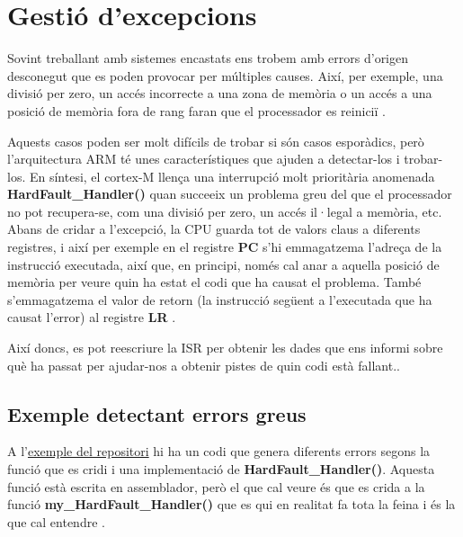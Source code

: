 
\chapter{Gestió d'excepcions}
\label{ch:exceptions}
Sovint treballant amb sistemes encastats ens trobem amb errors d'origen desconegut que es poden provocar per múltiples causes. Així, per exemple, una divisió per zero, un accés incorrecte a una zona de memòria o un accés a una posició de memòria fora de rang faran que el processador es reiniciï \cite[102]{DesignersGuide}\cite[318]{ARMsdg}\cite{KielHardFault}.

Aquests casos poden ser molt difícils de trobar si són casos esporàdics, però l'arquitectura ARM té unes característiques que ajuden a detectar-los i trobar-los. En síntesi, el cortex-M llença una interrupció molt prioritària anomenada {\bf HardFault\_Handler()} quan succeeix un problema greu del que el processador no pot recupera-se, com una divisió per zero, un accés il·legal a memòria, etc. Abans de cridar a l'excepció, la CPU guarda tot de valors claus a diferents registres, i així per exemple en el registre {\bf PC} s'hi emmagatzema l'adreça de la instrucció executada, així que, en principi, només cal anar a aquella posició de memòria per veure quin ha estat el codi que ha causat el problema. També s'emmagatzema el valor de retorn (la  instrucció següent a l'executada que ha causat l'error) al registre {\bf LR} \cite{BlogHardFalut}.

Així doncs, es pot reescriure la ISR per obtenir les dades que ens informi sobre què ha passat per ajudar-nos a obtenir pistes de quin codi està fallant.\cite{ARMHandler}.

\section{Exemple detectant errors greus}
A l'\href{https://github.com/mariusmm/cursembedded/tree/master/Simplicity/ErrorHandling}{exemple del repositori} hi ha un codi que genera diferents errors segons la funció que es cridi i una implementació de {\bf HardFault\_Handler()}. Aquesta funció està escrita en assemblador, però el que cal veure és que es crida a la funció {\bf my\_HardFault\_Handler()} que es qui en realitat fa tota la feina i és la que cal entendre \cite{EFM32HardFault}.

